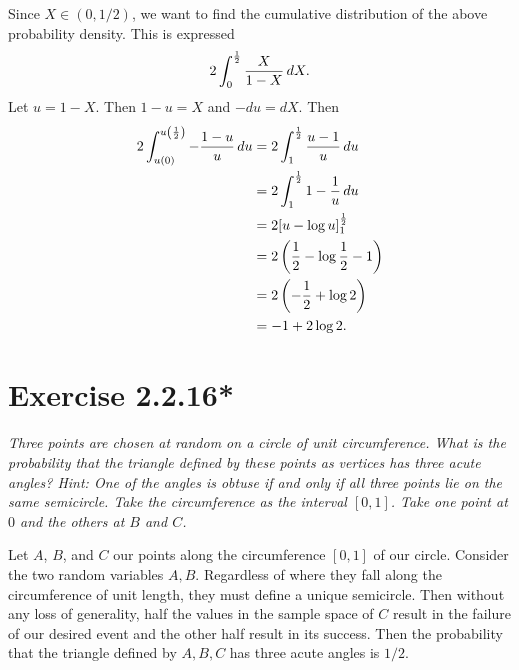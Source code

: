 \documentclass{tufte-handout}
\begin{document}
Since $X \in (0, 1/2)$, we want to find the cumulative distribution of
the above probability density. This is expressed%
\[ 2\int_0^{1 \over 2} {X \over 1 - X} \, dX.\]%
Let $u = 1 - X$. Then $1 - u = X$ and $-du = dX$. Then
\begin{align*}
  2\int_{u(0)}^{u \left({1 \over 2} \right) } -{1 - u \over u} \, du
  &= 2\int_1^{1 \over 2} {u - 1 \over u} \, du\\
  &= 2\int_1^{1 \over 2} 1 - {1 \over u} \, du\\
  &= 2{\left[ u - \log u \right]}_1^{1 \over 2}\\
  &= 2\left({1 \over 2} - \log {1 \over 2} - 1\right)\\
  &= 2 \left( -{1 \over 2} + \log 2 \right)\\
  &= -1 + 2 \log 2.
\end{align*}

\section{Exercise 2.2.16*}

\emph{Three points are chosen \emph{at random} on a circle of
  \emph{unit circumference}. What is the probability that the triangle
  defined by these points as vertices has three acute angles?
  \emph{Hint}: One of the angles is obtuse if and only if all three
  points lie on the same semicircle. Take the circumference as the
  interval $[0,1]$. Take one point at $0$ and the others at $B$ and
  $C$.}

\bigskip

Let $A$, $B$, and $C$ our points along the circumference $[0,1]$ of
our circle. Consider the two random variables $A,B$. Regardless of
where they fall along the circumference of unit length, they must
define a unique semicircle. Then without any loss of generality, half
the values in the sample space of $C$ result in the failure of our
desired event and the other half result in its success. Then the
probability that the triangle defined by $A,B,C$ has three acute
angles is $1/2$.
\end{document}
